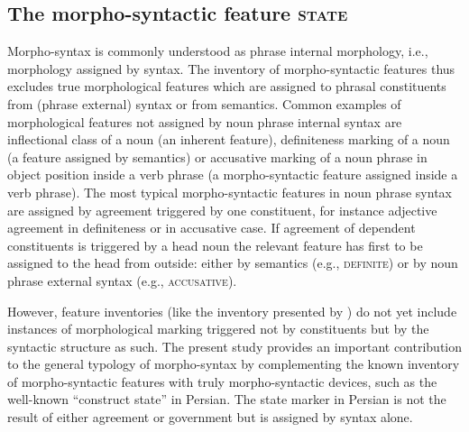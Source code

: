\subsection{The morpho-syntactic feature \textsc{state}}
Morpho-syntax is commonly understood as phrase internal morphology, i.e., morphology assigned by syntax. The inventory of morpho-syntactic features thus excludes true morphological features which are assigned to phrasal constituents from (phrase external) syntax or from semantics. Common examples of morphological features not assigned by noun phrase internal syntax are inflectional class of a noun (an inherent feature), definiteness marking of a noun (a feature assigned by semantics) or accusative marking of a noun phrase in object position inside a verb phrase (a morpho-syntactic feature assigned inside a verb phrase). The most typical morpho-syntactic features in noun phrase syntax are assigned by agreement triggered by one constituent, for instance adjective agreement in definiteness or in accusative case. If agreement of dependent constituents is triggered by a head noun the relevant feature has first to be assigned to the head from outside: either by semantics (e.g., \textsc{definite}) or by noun phrase external syntax (e.g., \textsc{accusative}). 

However, feature inventories (like the inventory presented by \citealt{kibort2010a}) do not yet include instances of morphological marking triggered not by constituents but by the syntactic structure as such. The present study provides an important contribution to the general typology of morpho-syntax by complementing the known inventory of morpho-syntactic features with truly morpho-syntactic devices, such as the well-known “construct state” in Persian. The state marker in Persian is not the result of either agreement or government but is assigned by syntax alone.

